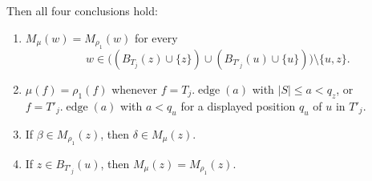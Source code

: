 \begin{helper}
\begin{enumerate}
\end{enumerate}
Then all four conclusions hold:
\begin{enumerate}
\item \(M_\mu(w)=M_{\rho_1}(w)\) for every
\[
 w\in\bigl((B_{T_j}(z)\cup\{z\})\cup
              (B_{T'_j}(u)\cup\{u\})\bigr)\setminus\{u,z\}.
\]
\item \(\mu(f)=\rho_1(f)\) whenever \(f=T_j.\operatorname{edge}(a)\)
with \(|S|\le a<q_z\), or \(f=T'_j.\operatorname{edge}(a)\)
with \(a<q_u\) for a displayed position \(q_u\) of \(u\) in \(T'_j\).
\item If \(\beta\in M_{\rho_1}(z)\), then \(\delta\in M_\mu(z)\).
\item If \(z\in B_{T'_j}(u)\), then \(M_\mu(z)=M_{\rho_1}(z)\).
\end{enumerate}
\end{helper}
